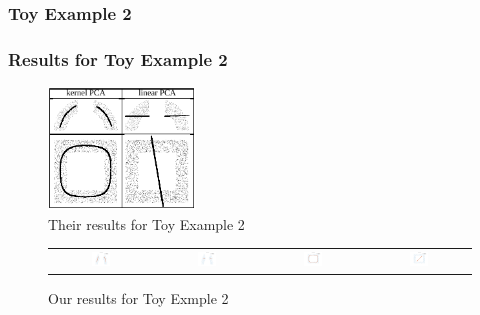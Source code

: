 \documentclass{beamer}
\begin{document}
\begin{frame}
    \frametitle{Toy Example 2}

\end{frame}

\begin{frame}
    \frametitle{Results for Toy Example 2}
    \begin{figure}
        \centering
        \includegraphics[width=0.35\textwidth]{images/paper-toy2-edit}
        \caption*{Their results for Toy Example 2}
    \end{figure}
    \begin{figure}
            \begin{tabular}{c c c c}
                \includegraphics[width=0.20\textwidth]{../code/fig/kpca_circle} &
                \includegraphics[width=0.20\textwidth]{../code/fig/pca_circle}
                &
                \includegraphics[width=0.20\textwidth]{../code/fig/kpca_box} &
                \includegraphics[width=0.20\textwidth]{../code/fig/pca_box} 
            \end{tabular}
        \caption*{Our results for Toy Exmple 2}
    \end{figure}
\end{frame}
\end{document}
